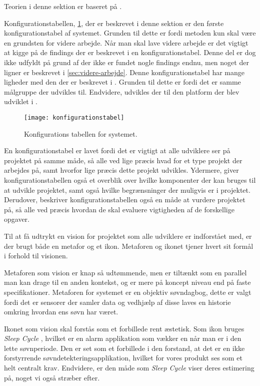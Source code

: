 Teorien i denne sektion er baseret på \citet{art:essence}.

Konfigurationstabellen, \cref{tab:konfigurationsTabel}, der er beskrevet i denne sektion er den første konfigurationstabel af systemet.
Grunden til dette er fordi metoden kun skal være en grundsten for videre arbejde.
Når man skal lave videre arbejde er det vigtigt at kigge på de findings der er beskrevet i en konfigurationstabel.
Denne del er dog ikke udfyldt på grund af der ikke er fundet nogle findings endnu, men noget der ligner er beskrevet i \cref{sec:videre-arbejde}.
Denne konfigurationstabel har mange ligheder med den der er beskrevet i \citet{misc:faellesrapp}.
Grunden til dette er fordi det er samme målgruppe der udvikles til.
Endvidere, udvikles der til den platform der blev udviklet i \citet{misc:faellesrapp}.

\begin{figure}[]
	\centering
	\texttt{[image: konfigurationstabel]}
	\caption{Konfigurations tabellen for systemet.}
	\label{tab:konfigurationsTabel}
\end{figure}

En konfigurationstabel er lavet fordi det er vigtigt at alle udviklere ser på projektet på samme måde, så alle ved lige præcis hvad for et type projekt der arbejdes på, samt hvorfor lige præcis dette projekt udvikles.
Ydermere, giver konfigurationstabellen også et overblik over hvilke komponenter der kan bruges til at udvikle projektet, samt også hvilke begrænsninger der muligvis er i projektet.
Derudover, beskriver konfigurationstabellen også en måde at vurdere projektet på, så alle ved præcis hvordan de skal evaluere vigtigheden af de forskellige opgaver.

Til at få udtrykt en vision for projektet som alle udviklere er indforstået med, er der brugt både en metafor og et ikon.
Metaforen og ikonet tjener hvert sit formål i forhold til visionen.

Metaforen som vision er knap så udtømmende, men er tiltænkt som en parallel man kan drage til en anden kontekst, og er mere på koncept niveau end på faste specifikationer.
Metaforen for systemet er en objektiv søvndagbog, dette er valgt fordi det er sensorer der samler data og vedhjælp af disse laves en historie omkring hvordan ens søvn har været.

Ikonet som vision skal forstås som et forbillede rent æstetisk.
Som ikon bruges \textit{Sleep Cycle} \citep{misc:sleepCycle}, hvilket er en alarm applikation som vækker en når man er i den lette søvnperiode.
Den er set som et forbillede i den forstand, at det er en ikke forstyrrende søvndetekteringsapplikation, hvilket for vores produkt ses som et helt centralt krav.
Endvidere, er den måde som \textit{Sleep Cycle} viser deres estimering på, noget vi også stræber efter.